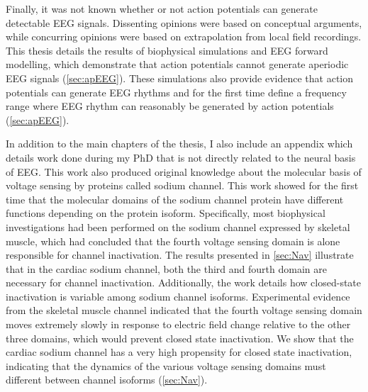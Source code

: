 Finally, it was not known whether or not action potentials can generate detectable EEG signals. Dissenting opinions were based on conceptual arguments, while concurring opinions were based on extrapolation from local field recordings. This thesis details the results of biophysical simulations and EEG forward modelling, which demonstrate that action potentials cannot generate aperiodic EEG signals (\autoref{sec:apEEG}). These simulations also provide evidence that action potentials can generate EEG rhythms and for the first time define a frequency range where EEG rhythm can reasonably be generated by action potentials (\autoref{sec:apEEG}).

In addition to the main chapters of the thesis, I also include an appendix which details work done during my PhD that is not directly related to the neural basis of EEG. This work also produced original knowledge about the molecular basis of voltage sensing by proteins called sodium channel. This work showed for the first time that the molecular domains of the sodium channel protein have different functions depending on the protein isoform. Specifically, most biophysical investigations had been performed on the sodium channel expressed by skeletal muscle, which had concluded that the fourth voltage sensing domain is alone responsible for channel inactivation. The results presented in \autoref{sec:Nav} illustrate that in the cardiac sodium channel, both the third and fourth domain are necessary for channel inactivation. Additionally, the work details how closed-state inactivation is variable among sodium channel isoforms. Experimental evidence from the skeletal muscle channel indicated that the fourth voltage sensing domain moves extremely slowly in response to electric field change relative to the other three domains, which would prevent closed state inactivation. We show that the cardiac sodium channel has a very high propensity for closed state inactivation, indicating that the dynamics of the various voltage sensing domains must different between channel isoforms (\autoref{sec:Nav}).

